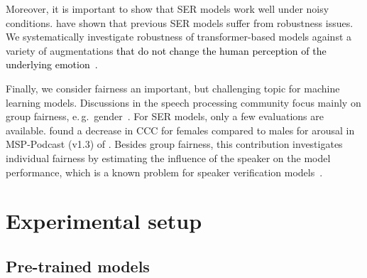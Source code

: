 \documentclass{article}
\newcommand{\review}[1]{\textcolor{black}{#1}}
\newcommand\msppodcast{\mbox{MSP-Podcast}}
\newcommand{\eg}{e.\,g.\ }
\begin{document}
Moreover, it is important to show
that \ac{SER} models work well under noisy conditions.
\citet{jaiswal2021robustness,pappagari2020robustness,Oates19-RSE,Triantafyllopoulos19-TRS} have shown
that previous \ac{SER} models suffer from robustness issues.
We systematically investigate robustness of transformer-based models
against a variety of augmentations
\review{
that 
do not change the human perception
of the underlying emotion~\citep{jaiswal2021robustness}.
}

Finally,
we consider fairness an important,
but challenging topic for machine learning models.
Discussions in the speech processing community focus mainly on group fairness,
\eg gender~\citep{rajan2021fairness}. 
For \ac{SER} models,
only a few evaluations are available.
\citet{gorrostieta2019gender} found a decrease in \ac{CCC} for females
compared to males for arousal in {\msppodcast} (v1.3) of .
Besides group fairness,
this contribution investigates individual fairness
by estimating the influence of the speaker on the model performance,
which is a known problem for speaker verification models~\citep{doddington1998sheep}.





\section{Experimental setup}
\label{sec:setup}





\subsection{Pre-trained models}
\label{subsec:models}
\end{document}

